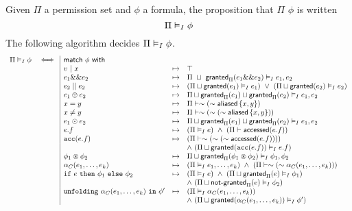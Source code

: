 Given $\Pi$ a permission set and $\phi$ a formula, the proposition that $\Pi$  $\phi$ is written
$$
\Pi \vDash_I \phi
$$
\noindent
The following algorithm decides $\Pi \vDash_I \phi$.
\begin{align*}
\begin{array}{rc|lrl}
\Pi \frames \phi & \iff & \tsf{match} \ \phi \ \tsf{with} && \\
%
%
&& v \ | \ x &\mt&
  \top
\\
&& e_1 \band e_2 &\mt&
  \Pi \ \merge \ \grantedPi(e_1 \band e_2) \frames e_1, e_2
\\
&& e_2 \bor e_2 &\mt&
  (\Pi \merge \granted(e_1) \frames e_1) \ \lor \
  (\Pi \merge \granted(e_2) \frames e_2)
\\
&& e_1 \oplus e_2 &\mt&
  \Pi \merge \grantedPi(e_1) \merge \grantedPi(e_2) \frames e_1, e_2
\\
&& x = y &\mt&
  \Pi \entails \pnot (\pnot \aliased\set{x,y})
\\
&& x \neq y &\mt&
  \Pi \entails \pnot (\pnot (\pnot \aliased\set{x,y}))
\\
&& e_1 \odot e_2 &\mt&
  \Pi \merge \grantedPi(e_1) \merge \grantedPi(e_2) \frames e_1, e_2
\\
&& e.f &\mt&
  (\Pi \frames e) \ \land \
  (\Pi \entails \accessed(e.f))
\\
&& \cacc(e.f) &\mt&
  (\Pi \entails \pnot (\pnot (\pnot \accessed(e.f)))) \\ &&&& \land \
  (\Pi \merge \granted(\cacc(e.f)) \frames e.f)
\\
&& \phi_1 \oast \phi_2 &\mt&
  \Pi \merge \grantedPi(\phi_1 \oast \phi_2) \frames
  \phi_1, \phi_2
\\
&& \alpha_C(e_1, \dots, e_k) &\mt&
  (\Pi \frames e_1, \dots, e_k) \ \land \
  (\Pi \entails \pnot (\pnot \alpha_C(e_1, \dots, e_k)))
\\
&& \cif \ e \ \cthen \ \phi_1 \ \celse \ \phi_2 &\mt&
  (\Pi \frames e) \ \land \
  (\Pi \merge \grantedPi(e) \frames \phi_1) \\ &&&& \land \
  (\Pi \merge \notgrantedPi(e) \frames \phi_2)
\\
&& \cunfolding \ \alpha_C(e_1, \dots, e_k) \ \cin \ \phi\p &\mt&
  (\Pi \frames \alpha_C(e_1, \dots, e_k)) \\ &&&& \land \
  (\Pi \merge \granted(\alpha_C(e_1, \dots, e_k)) \frames \phi\p)
\end{array}
\end{align*}

